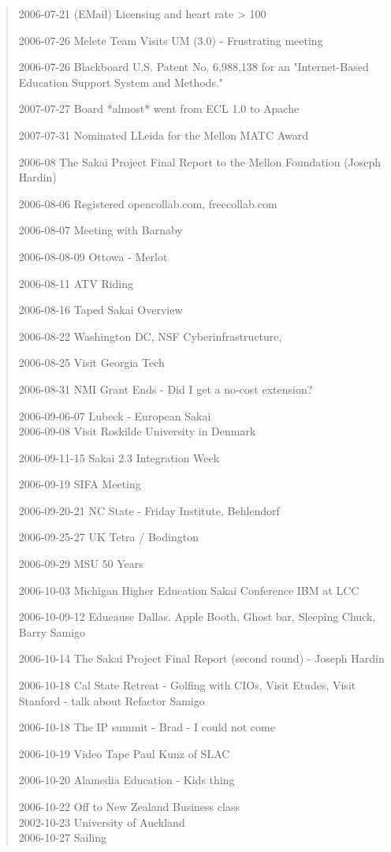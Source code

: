 \begin{quote}
2006-07-21 (EMail) Licensing and heart rate > 100

2006-07-26 Melete Team Visits UM (3.0) - Frustrating meeting

2006-07-26 Blackboard U.S. Patent No. 6,988,138 for an "Internet-Based Education Support System and Methods." 

2007-07-27 Board *almost* went from ECL 1.0 to Apache

2007-07-31 Nominated LLeida for the Mellon MATC Award

2006-08 The Sakai Project Final Report to the Mellon Foundation (Joseph Hardin)

2006-08-06 Registered opencollab.com, freecollab.com

2006-08-07 Meeting with Barnaby

2006-08-08-09 Ottowa - Merlot

2006-08-11 ATV Riding

2006-08-16 Taped Sakai Overview

2006-08-22 Washington DC, NSF Cyberinfrastructure, 

2006-08-25 Visit Georgia Tech

2006-08-31 NMI Grant Ends - Did I get a no-cost extension?

2006-09-06-07 Lubeck - European Sakai\\
2006-09-08 Visit Roskilde University in Denmark

2006-09-11-15 Sakai 2.3 Integration Week

2006-09-19 SIFA Meeting

2006-09-20-21 NC State - Friday Institute, Behlendorf

2006-09-25-27 UK Tetra / Bodington

2006-09-29 MSU 50 Years

2006-10-03 Michigan Higher Education Sakai Conference IBM at LCC

2006-10-09-12 Educause Dallas.  Apple Booth, Ghost bar, Sleeping Chuck, Barry Samigo

2006-10-14 The Sakai Project Final Report (second round) - Joseph Hardin

2006-10-18 Cal State Retreat - Golfing with CIOs, Visit Etudes, Visit Stanford - talk about Refactor Samigo

2006-10-18 The IP summit - Brad - I could not come

2006-10-19 Video Tape Paul Kunz of SLAC

2006-10-20 Alamedia Education - Kids thing

2006-10-22 Off to New Zealand Business class \\
2002-10-23 University of Auckland\\
2006-10-27 Sailing\\


\end{quote}
